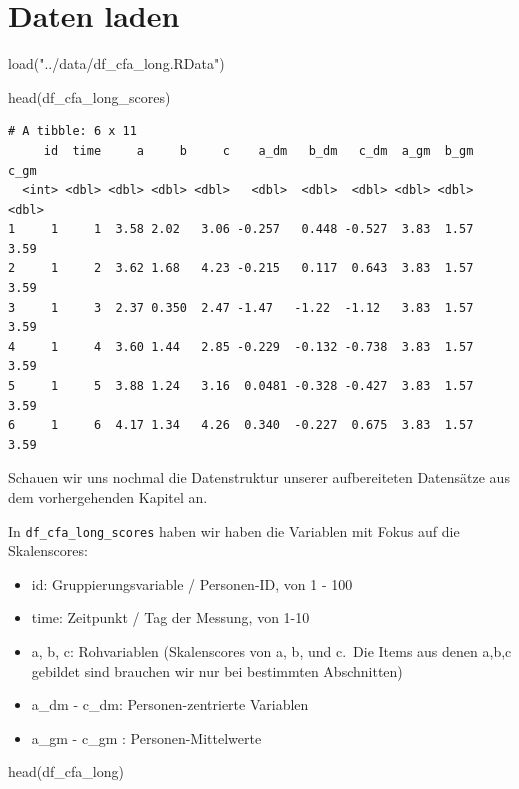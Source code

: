 \documentclass[
  letterpaper,
  DIV=11,
  numbers=noendperiod]{scrreprt}
\newenvironment{Shaded}{\begin{snugshade}}{\end{snugshade}}
\newcommand{\FunctionTok}[1]{\textcolor[rgb]{0.28,0.35,0.67}{#1}}
\newcommand{\NormalTok}[1]{\textcolor[rgb]{0.00,0.23,0.31}{#1}}
\newcommand{\StringTok}[1]{\textcolor[rgb]{0.13,0.47,0.30}{#1}}
\providecommand{\tightlist}{%
  \setlength{\itemsep}{0pt}\setlength{\parskip}{0pt}}\usepackage{longtable,booktabs,array}
\begin{document}
\section{Daten laden}\label{daten-laden}

\begin{Shaded}
\begin{Highlighting}[]
\FunctionTok{load}\NormalTok{(}\StringTok{"../data/df\_cfa\_long.RData"}\NormalTok{)}

\FunctionTok{head}\NormalTok{(df\_cfa\_long\_scores)}
\end{Highlighting}
\end{Shaded}

\begin{verbatim}
# A tibble: 6 x 11
     id  time     a     b     c    a_dm   b_dm   c_dm  a_gm  b_gm  c_gm
  <int> <dbl> <dbl> <dbl> <dbl>   <dbl>  <dbl>  <dbl> <dbl> <dbl> <dbl>
1     1     1  3.58 2.02   3.06 -0.257   0.448 -0.527  3.83  1.57  3.59
2     1     2  3.62 1.68   4.23 -0.215   0.117  0.643  3.83  1.57  3.59
3     1     3  2.37 0.350  2.47 -1.47   -1.22  -1.12   3.83  1.57  3.59
4     1     4  3.60 1.44   2.85 -0.229  -0.132 -0.738  3.83  1.57  3.59
5     1     5  3.88 1.24   3.16  0.0481 -0.328 -0.427  3.83  1.57  3.59
6     1     6  4.17 1.34   4.26  0.340  -0.227  0.675  3.83  1.57  3.59
\end{verbatim}

Schauen wir uns nochmal die Datenstruktur unserer aufbereiteten
Datensätze aus dem vorhergehenden Kapitel an.

In \texttt{df\_cfa\_long\_scores} haben wir haben die Variablen mit
Fokus auf die Skalenscores:

\begin{itemize}
\tightlist
\item
  id: Gruppierungsvariable / Personen-ID, von 1 - 100
\item
  time: Zeitpunkt / Tag der Messung, von 1-10
\item
  a, b, c: Rohvariablen (Skalenscores von a, b, und c.~Die Items aus
  denen a,b,c gebildet sind brauchen wir nur bei bestimmten Abschnitten)
\item
  a\_dm - c\_dm: Personen-zentrierte Variablen
\item
  a\_gm - c\_gm : Personen-Mittelwerte
\end{itemize}

\begin{Shaded}
\begin{Highlighting}[]
\FunctionTok{head}\NormalTok{(df\_cfa\_long)}
\end{Highlighting}
\end{Shaded}
\end{document}
